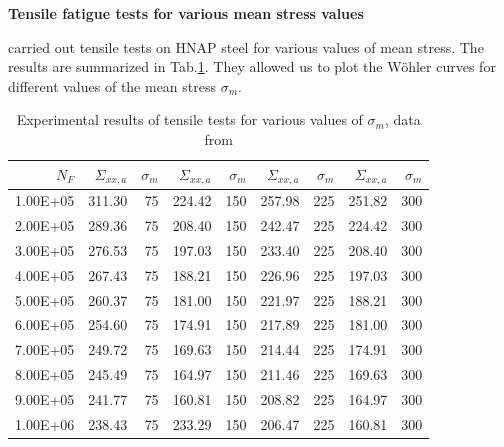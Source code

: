 \noindent
\vspace{6pt}
\textbf{Tensile fatigue tests for various mean stress values}
\vspace{6pt}

\cite{VIDAL1996} carried out tensile tests on HNAP steel for various values of mean stress. The results are summarized in Tab.\ref{tab.10HNAPmean}. They allowed us to plot the Wöhler curves for different values of the mean stress $\sigma_m$. 

\begin{table}[!h]
	\centering
	\begin{tabular}{r|rr|rr|rr|rr}
		\hline
		$N_F$    & $\Sigma_{xx,a}$ & $\sigma_m$ & $\Sigma_{xx,a}$ & $\sigma_m$ & $\Sigma_{xx,a}$ & $\sigma_m$ & $\Sigma_{xx,a}$ & $\sigma_m$ \\ \hline
		1.00E+05 & 311.30          & 75         & 224.42          & 150        & 257.98          & 225        & 251.82          & 300        \\
		2.00E+05 & 289.36          & 75         & 208.40          & 150        & 242.47          & 225        & 224.42          & 300        \\
		3.00E+05 & 276.53          & 75         & 197.03          & 150        & 233.40          & 225        & 208.40          & 300        \\
		4.00E+05 & 267.43          & 75         & 188.21          & 150        & 226.96          & 225        & 197.03          & 300        \\
		5.00E+05 & 260.37          & 75         & 181.00          & 150        & 221.97          & 225        & 188.21          & 300        \\
		6.00E+05 & 254.60          & 75         & 174.91          & 150        & 217.89          & 225        & 181.00          & 300        \\
		7.00E+05 & 249.72          & 75         & 169.63          & 150        & 214.44          & 225        & 174.91          & 300        \\
		8.00E+05 & 245.49          & 75         & 164.97          & 150        & 211.46          & 225        & 169.63          & 300        \\
		9.00E+05 & 241.77          & 75         & 160.81          & 150        & 208.82          & 225        & 164.97          & 300        \\
		1.00E+06 & 238.43          & 75         & 233.29          & 150        & 206.47          & 225        & 160.81          & 300        \\ \hline
	\end{tabular}
\caption{Experimental results of tensile tests for various values of $\sigma_m$, data from \cite{VIDAL1996}}
\label{tab.10HNAPmean}
\end{table}

